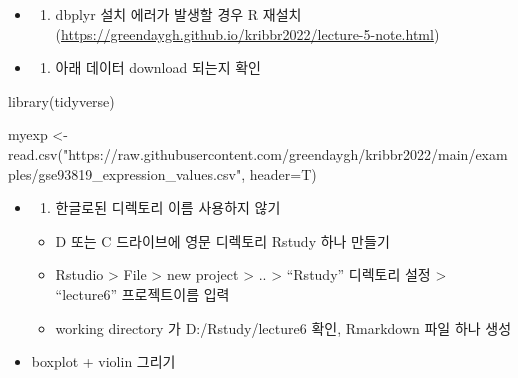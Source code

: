 \documentclass[
]{book}
\newenvironment{Shaded}{\begin{snugshade}}{\end{snugshade}}
\newcommand{\AttributeTok}[1]{\textcolor[rgb]{0.77,0.63,0.00}{#1}}
\newcommand{\FunctionTok}[1]{\textcolor[rgb]{0.00,0.00,0.00}{#1}}
\newcommand{\NormalTok}[1]{#1}
\newcommand{\OtherTok}[1]{\textcolor[rgb]{0.56,0.35,0.01}{#1}}
\newcommand{\StringTok}[1]{\textcolor[rgb]{0.31,0.60,0.02}{#1}}
\providecommand{\tightlist}{%
  \setlength{\itemsep}{0pt}\setlength{\parskip}{0pt}}
\begin{document}
\begin{itemize}
\item
  \begin{enumerate}
  \def\labelenumi{\arabic{enumi})}
  \setcounter{enumi}{1}
  \tightlist
  \item
    dbplyr 설치 에러가 발생할 경우 R 재설치 (\url{https://greendaygh.github.io/kribbr2022/lecture-5-note.html})
  \end{enumerate}
\item
  \begin{enumerate}
  \def\labelenumi{\arabic{enumi})}
  \setcounter{enumi}{2}
  \tightlist
  \item
    아래 데이터 download 되는지 확인
  \end{enumerate}
\end{itemize}

\begin{Shaded}
\begin{Highlighting}[]
\FunctionTok{library}\NormalTok{(tidyverse)}

\NormalTok{myexp }\OtherTok{\textless{}{-}} \FunctionTok{read.csv}\NormalTok{(}\StringTok{"https://raw.githubusercontent.com/greendaygh/kribbr2022/main/examples/gse93819\_expression\_values.csv"}\NormalTok{, }\AttributeTok{header=}\NormalTok{T)}
\end{Highlighting}
\end{Shaded}

\begin{itemize}
\item
  \begin{enumerate}
  \def\labelenumi{\arabic{enumi})}
  \setcounter{enumi}{3}
  \tightlist
  \item
    한글로된 디렉토리 이름 사용하지 않기
  \end{enumerate}

  \begin{itemize}
  \tightlist
  \item
    D 또는 C 드라이브에 영문 디렉토리 Rstudy 하나 만들기
  \item
    Rstudio \textgreater{} File \textgreater{} new project \textgreater{} .. \textgreater{} ``Rstudy'' 디렉토리 설정 \textgreater{} ``lecture6'' 프로젝트이름 입력
  \item
    working directory 가 D:/Rstudy/lecture6 확인, Rmarkdown 파일 하나 생성
  \end{itemize}
\item
  boxplot + violin 그리기
\end{itemize}
\end{document}
